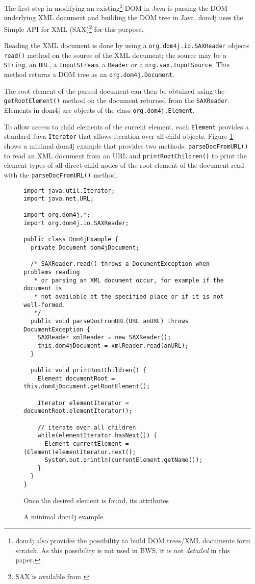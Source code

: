 The first step in modifying an existing\footnote{dom4j also provides the possibility to build DOM trees/XML documents form scratch. As this possibility is not used in BWS, it is not \emph{detailed} in this paper.}  DOM in Java is parsing the DOM underlying XML document and building the DOM tree in Java. dom4j uses the Simple API for XML (SAX)\footnote{SAX is available from \cite{SaxHP}} for this purpose.


Reading the XML document is done by using a \texttt{org.dom4j.io.SAXReader} objects \texttt{read()} method on the source of the XML document; the source may be a \texttt{String}, an \texttt{URL}, a \texttt{InputStream}, a \texttt{Reader} or a \texttt{org.sax.InputSource}. This method returns a DOM tree as an \texttt{org.dom4j.Document}.

The root element of the parsed document can then be obtained using the \texttt{getRootElement()} method on the document returned from the \texttt{SAXReader}. Elements in dom4j are objects of the class \texttt{org.dom4j.Element}.

To allow access to child elements of the current element, each \texttt{Element} provides a standard Java \texttt{Iterator} that allows iteration over all child objects. Figure \ref{fig:AMinimalDom4jExample} shows a minimal dom4j example that provides two methods: \texttt{parseDocFromURL()} to read an XML document from an URL and \texttt{printRootChildren()} to print the element types of all direct child nodes of the root element of the document read with the \texttt{parseDocFromURL()} method.

\begin{figure}[htb]
  \begin{verbatim}
import java.util.Iterator;
import java.net.URL;

import org.dom4j.*;
import org.dom4j.io.SAXReader;

public class Dom4jExample {
  private Document dom4jDocument;
  
  /* SAXReader.read() throws a DocumentException when problems reading
   * or parsing an XML document occur, for example if the document is
   * not available at the specified place or if it is not well-formed.
   */
  public void parseDocFromURL(URL anURL) throws DocumentException {
    SAXReader xmlReader = new SAXReader();
    this.dom4jDocument = xmlReader.read(anURL);
  }
  
  public void printRootChildren() {
    Element documentRoot = this.dom4jDocument.getRootElement();
    
    Iterator elementIterator = documentRoot.elementIterator();
    
    // iterate over all children
    while(elementIterator.hasNext()) {
      Element currentElement = (Element)elementIterator.next();
      System.out.println(currentElement.getName());
    }
  }
}
  \end{verbatim}

Once the desired element is found, its attributes 

	\caption{A minimal dom4j example}
	\label{fig:AMinimalDom4jExample}
\end{figure}